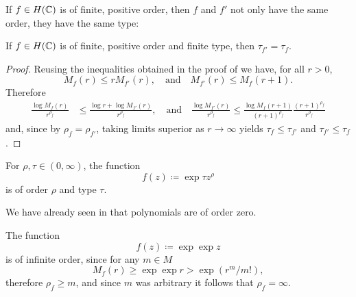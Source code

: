 
If $f \in H(\mathbb{C})$ is of finite, positive order, then $f$ and $f'$ not only have the same order, they have the same type:

\begin{proposition} \label{prop:type-derivative}
    If $f \in H(\mathbb{C})$ is of finite, positive order and finite type, then $\tau_{f'} = \tau_f$.
\end{proposition}

\begin{proof}
    Reusing the inequalities obtained in the proof of  we have, for all $r > 0$,
    \begin{equation*}
        M_f(r) \leq r M_{f'}(r), \quad \textrm{and} \quad M_{f'}(r) \leq M_f(r+1).
    \end{equation*}
    Therefore
    \begin{align*}
        \frac{\log M_f(r)}{r^{\rho_f}} &\leq \frac{\log r + \log M_{f'}(r)}{r^{\rho_f}}, \quad \textrm{and} \quad \frac{\log M_{f'}(r)}{r^{\rho_f}} \leq \frac{\log M_{f}(r+1)}{(r+1)^{\rho_f}} \frac{(r+1)^{\rho_f}}{r^{\rho_f}}
    \end{align*}
    and, since by  $\rho_f = \rho_{f'}$, taking limits superior as $r \to \infty$ yields $\tau_f \leq \tau_{f'}$ and $\tau_{f'} \leq \tau_f$.
\end{proof}

\begin{example} \label{exm:order-and-type}
    \leavevmode
    \begin{arrowlist}
        \item For $\rho, \tau \in (0, \infty)$, the function
        $$ f(z) \coloneqq \exp {\tau z^\rho} $$
        is of order $\rho$ and type $\tau$.
        \item We have already seen in  that polynomials are of order zero.
        \item The function
        $$ f(z) \coloneqq \exp \exp z $$
        is of infinite order, since for any $m \in M$
        $$ M_f(r) \geq \exp \exp r > \exp (r^m / m!), $$
        therefore $\rho_f \geq m$, and since $m$ was arbitrary it follows that $\rho_f = \infty$.
        \qedhere
    \end{arrowlist}
\end{example}